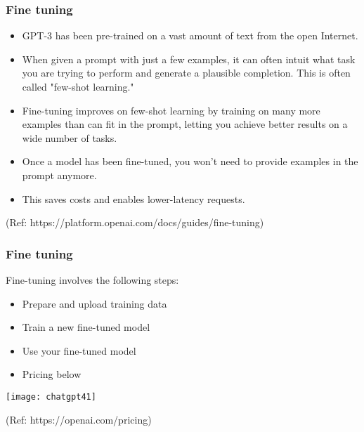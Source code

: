\begin{frame}[fragile]\frametitle{Fine tuning}

\begin{itemize}
\item GPT-3 has been pre-trained on a vast amount of text from the open Internet. 
\item When given a prompt with just a few examples, it can often intuit what task you are trying to perform and generate a plausible completion. This is often called "few-shot learning."
\item Fine-tuning improves on few-shot learning by training on many more examples than can fit in the prompt, letting you achieve better results on a wide number of tasks. 
\item Once a model has been fine-tuned, you won't need to provide examples in the prompt anymore. 
\item This saves costs and enables lower-latency requests.
\end{itemize}	 


{\tiny (Ref: https://platform.openai.com/docs/guides/fine-tuning)}
\end{frame}

\begin{frame}[fragile]\frametitle{Fine tuning}

Fine-tuning involves the following steps:

\begin{itemize}
\item Prepare and upload training data
\item Train a new fine-tuned model
\item Use your fine-tuned model
\item Pricing below
\end{itemize}	 

\begin{center}
\texttt{[image: chatgpt41]}

{\tiny (Ref: https://openai.com/pricing)}

\end{center}		

\end{frame}

